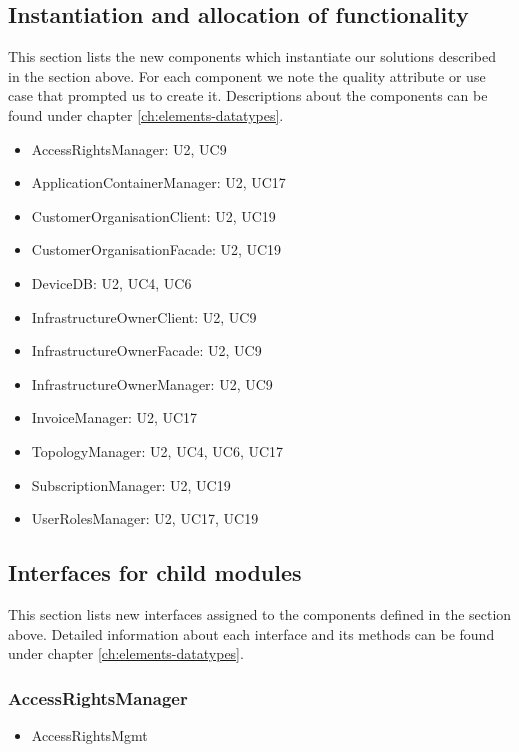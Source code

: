 \subsection{Instantiation and allocation of functionality}
    This section lists the new components which instantiate our solutions
    described in the section above. For each component we note the quality
    attribute or use case that prompted us to create it. Descriptions about
    the components can be found under chapter \ref{ch:elements-datatypes}. \\

    \begin{itemize}
        \item AccessRightsManager: U2, UC9
        \item ApplicationContainerManager: U2, UC17
        \item CustomerOrganisationClient: U2, UC19
        \item CustomerOrganisationFacade: U2, UC19
        \item DeviceDB: U2, UC4, UC6
        \item InfrastructureOwnerClient: U2, UC9
        \item InfrastructureOwnerFacade: U2, UC9
        \item InfrastructureOwnerManager: U2, UC9
        \item InvoiceManager: U2, UC17
        \item TopologyManager: U2, UC4, UC6, UC17
        \item SubscriptionManager: U2, UC19
        \item UserRolesManager: U2, UC17, UC19
    \end{itemize}


\subsection{Interfaces for child modules}
    This section lists new interfaces assigned to the components defined
    in the section above. Detailed information about each interface and
    its methods can be found under chapter \ref{ch:elements-datatypes}. \\

    \subsubsection{AccessRightsManager}
        \begin{itemize}
            \item AccessRightsMgmt
        \end{itemize}

